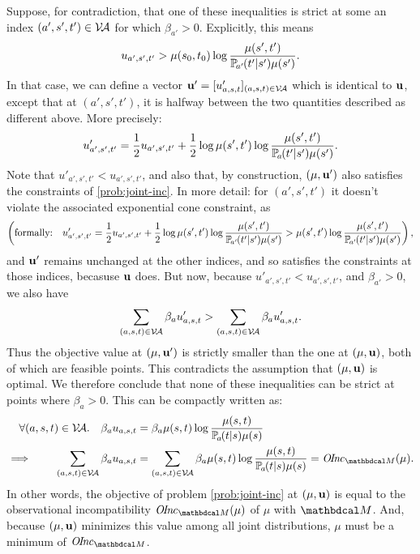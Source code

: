 \begin{lproof}
    Suppose, for contradiction, that one of these inequalities is strict at some an index $(a',s',t') \in \mathcal V\!\mathcal A$ for which $\beta_{a'} > 0$.
    Explicitly, this means
    $$
        u_{a',s',t'} > \mu(s_0,t_0) \log \frac{\mu(s',t')}{\p_{a'}(t'|s')\mu(s')}.
    $$
    In that case, we can define a vector $\mathbf{u}' = [u'_{a,s,t}]_{(a,s,t)\in\mathcal V\!\mathcal A}$ which is identical to $\mathbf{u}$, except that at $(a',s',t')$, it is halfway between the two quantities described as different above.  More precisely:
    $$
        u'_{a',s',t'} = \frac12 u_{a',s',t'} + \frac12 \log \mu(s',t') \log \frac{\mu(s',t')}{\p_a(t'|s')\mu(s')}.
    $$
    Note that $u'_{a',s',t'} < u_{a',s',t'}$,
    and also that, by construction, $(\mu, \mathbf{u}')$ also satisfies the constraints of \eqref{prob:joint-inc}.
    In more detail: for $(a', s', t')$ it doesn't violate the associated exponential cone constraint, as
    $$
        \left( \text{formally:} \quad
        u'_{a',s',t'} = \frac12 u_{a',s',t'} + \frac12 \log \mu(s',t')\log \frac{\mu(s',t')}{\p_{a'}(t'|s')\mu(s')}
        > 
        \mu(s',t') \log \frac{\mu(s',t')}{\p_{a'}(t'|s')\mu(s')}
        \right),
    $$
    and $\mathbf{u}'$ remains unchanged at the other indices, and so satisfies the constraints at those indices, becasuse $\mathbf{u}$ does. 
    But now, because $u'_{a', s', t'} < u_{a',s',t'}$, and $\beta_{a'} >0$, we also have
    \[
        \sum_{(a,s,t) \in \mathcal V\!\mathcal A} \beta_a u'_{a,s,t}
            > \sum_{(a,s,t) \in \mathcal V\!\mathcal A} \beta_a u'_{a,s,t}.
    \]
    Thus the objective value at $(\mu, \mathbf{u}')$ is strictly
    smaller than the one at $(\mu, \mathbf{u})$, both of which are feasible points. 
    This contradicts the assumption that $(\mu, \mathbf{u})$ is optimal. 
    We therefore conclude that none of these inequalities can be strict at points where $\beta_{a} > 0$. 
    This can be compactly written as: 
    \begin{align*}
        \forall (a,s,t) \in \V\!\Ar.\quad
        \beta_a u_{a,s,t} &= \beta_a \mu(s,t) \log \frac{\mu(s,t)}{\p_a(t|s)\mu(s)} \\
        \implies\qquad
        \sum_{(a,s,t) \in \V\!\Ar}\beta_a u_{a,s,t} 
            &= \sum_{(a,s,t) \in \V\!\Ar} \beta_a \mu(s,t) \log \frac{\mu(s,t)}{\p_a(t|s)\mu(s)} 
            = \OInc_{\dg M}(\mu).
    \end{align*}
    In other words, the objective of problem \eqref{prob:joint-inc} at
    $(\mu, \mathbf{u})$ is equal to the observational incompatibility $\OInc_{\dg M}(\mu)$ of $\mu$ with $\dg M$. 
    And, because $(\mu, \mathbf{u})$ minimizes this value among all joint distributions, $\mu$ must be a minimum of $\OInc_{\dg M}$. 
    

\end{lproof}
